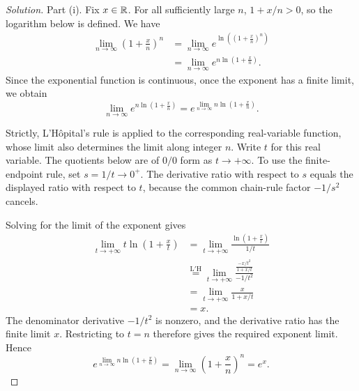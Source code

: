 \begin{proof}[Solution]
  Part (i).
  Fix $x\in\mathbb{R}$. For all sufficiently large $n$,
  $1+x/n>0$, so the logarithm below is defined. We have
  \[
    \begin{aligned}
      \lim_{n\to\infty}\left(1+\frac xn\right)^n
        &=\lim_{n\to\infty}
          e^{\ln\left((1+\frac xn)^n\right)}\\
        &=\lim_{n\to\infty}e^{n\ln(1+\frac xn)}.
    \end{aligned}
  \]
  Since the exponential function is continuous,
  once the exponent has a finite limit, we obtain
  \[
    \lim_{n\to\infty}e^{n\ln(1+\frac xn)}
      =e^{\lim_{n\to\infty}n\ln(1+\frac xn)}.
  \]

  Strictly, L'H\^opital's rule is applied to the
  corresponding real-variable function, whose limit also determines
  the limit along integer $n$. Write $t$ for this real variable.
  The quotients below are of $0/0$ form as $t\to+\infty$.
  To use the finite-endpoint rule, set $s=1/t\to0^+$. The derivative
  ratio with respect to $s$ equals the displayed ratio with respect
  to $t$, because the common chain-rule factor $-1/s^2$ cancels.

  Solving for the limit of the exponent gives
  \[
    \begin{aligned}
      \lim_{t\to+\infty}t\ln\left(1+\frac xt\right)
        &=\lim_{t\to+\infty}
          \frac{\ln(1+\frac xt)}{1/t}\\
        &\overset{\mathrm{L'H}}{=}\lim_{t\to+\infty}
          \frac{\frac{-x/t^2}{1+x/t}}{-1/t^2}\\
        &=\lim_{t\to+\infty}\frac{x}{1+x/t}\\
        &=x.
    \end{aligned}
  \]
  The denominator derivative $-1/t^2$ is nonzero,
  and the derivative ratio has the finite limit $x$. Restricting to
  $t=n$ therefore gives the required exponent limit. Hence
  \[
    e^{\lim_{n\to\infty}n\ln(1+\frac xn)}
      =\lim_{n\to\infty}\left(1+\frac xn\right)^n=e^x.
  \]


\end{proof}
